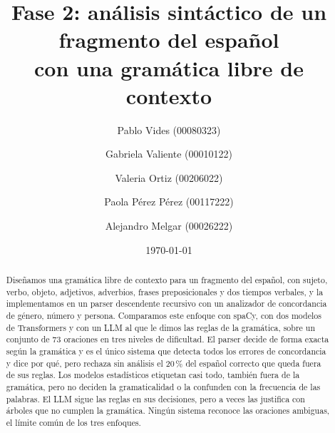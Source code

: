\documentclass[11pt, a4paper]{article}
\title{Fase 2: análisis sintáctico de un fragmento del español\\
  con una gramática libre de contexto}
\author{%
  Pablo Vides (00080323) \and Gabriela Valiente (00010122) \and
  Valeria Ortiz (00206022) \and Paola Pérez Pérez (00117222) \and
  Alejandro Melgar (00026222)}
\date{\today}
\begin{document}
\maketitle

\begin{abstract}
Diseñamos una gramática libre de contexto para un fragmento del español, con sujeto, verbo,
objeto, adjetivos, adverbios, frases preposicionales y dos tiempos verbales, y la
implementamos en un parser descendente recursivo con un analizador de concordancia de género,
número y persona. Comparamos este enfoque con spaCy, con dos modelos de Transformers y con un
LLM al que le dimos las reglas de la gramática, sobre un conjunto de 73 oraciones en tres
niveles de dificultad. El parser decide de forma exacta según la gramática y es el único sistema
que detecta todos los errores de concordancia y dice por qué, pero rechaza sin análisis el
20\,\% del español correcto que queda fuera de sus reglas. Los modelos estadísticos etiquetan
casi todo, también fuera de la gramática, pero no deciden la gramaticalidad o la confunden con
la frecuencia de las palabras. El LLM sigue las reglas en sus decisiones, pero a veces las
justifica con árboles que no cumplen la gramática. Ningún sistema reconoce las oraciones
ambiguas, el límite común de los tres enfoques.
\end{abstract}

\tableofcontents
\newpage













\end{document}

